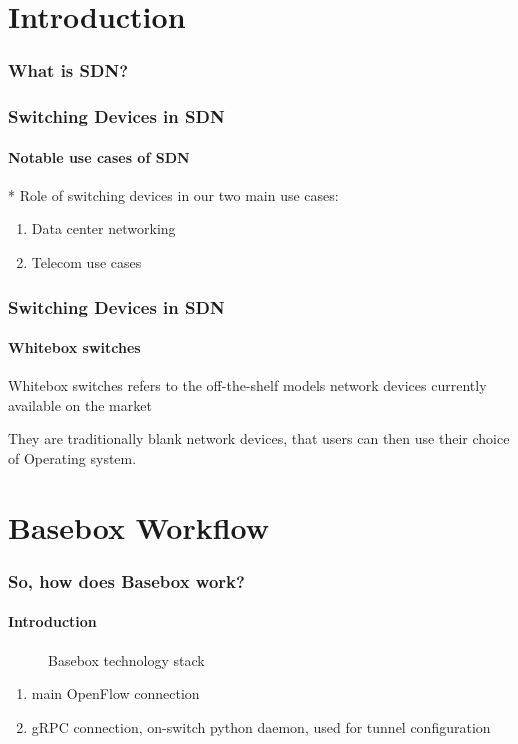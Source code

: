 \documentclass[11pt]{beamer}
\begin{document}
\begin{frame}

\section{Introduction}
\begin{frame}
\frametitle{What is SDN?}
\end{frame}

\begin{frame}
\frametitle{Switching Devices in SDN}
\framesubtitle{Notable use cases of SDN}
* Role of switching devices in our two main use cases:
\begin{enumerate}
\item Data center networking
\item Telecom use cases
\end{enumerate}
\end{frame}

\begin{frame}
\frametitle{Switching Devices in SDN}
\framesubtitle{Whitebox switches}

Whitebox switches refers to the off-the-shelf models network devices currently available on the market

They are traditionally blank network devices, that users can then use their choice of Operating system.

\end{frame}

\section{Basebox Workflow}
\begin{frame}
\frametitle{So, how does Basebox work?}
\framesubtitle{Introduction}

\begin{figure}
\caption{Basebox technology stack}
\end{figure}

\begin{enumerate}
\item main OpenFlow connection
\item gRPC connection, on-switch python daemon, used for tunnel configuration
\end{enumerate}

\end{frame}


\end{frame}
\end{document}
